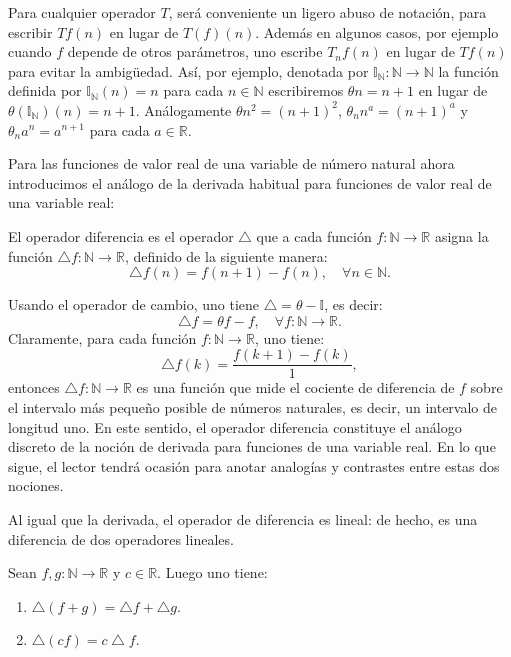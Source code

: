 Para cualquier operador $T$, será conveniente un ligero abuso de notación, para escribir $Tf(n)$ en lugar de $T(f)(n)$. Además en algunos casos, por ejemplo cuando $f$ depende de otros parámetros, uno escribe $T_{n}f(n)$ en lugar de $Tf(n)$ para evitar la ambigüedad. Así, por ejemplo, denotada por $\mathds{I}_{\mathds{N}}\colon\mathds{N}\rightarrow\mathds{N}$ la función definida por $\mathds{I}_{\mathds{N}}(n)=n$ para cada $n\in\mathds{N} $ escribiremos $\theta n=n+1$ en lugar de $\theta(\mathds{I}_{\mathds{N}})(n)=n+1$. Análogamente $\theta n^{2}=(n+1)^{2}$, $\theta_{n}n^{a}=(n+1)^{a}$ y $\theta_{n}a^{n}=a^{n+1}$ para cada $a\in\mathds{R}$.

Para las funciones de valor real de una variable de número natural ahora introducimos el análogo de la derivada habitual para funciones de valor real de una variable real:

\begin{definition}
	El operador diferencia es el operador $\bigtriangleup$ que a cada función $f\colon\mathds{N}\rightarrow\mathds{R}$ asigna la función $\bigtriangleup f\colon\mathds{N}\rightarrow \mathds{R}$, definido de la siguiente manera: \[ \bigtriangleup f(n)=f(n+1)-f(n),\quad\forall n\in\mathds{N}. \]
\end{definition}

\begin{remark}
	Usando el operador de cambio, uno tiene $\bigtriangleup=\theta-\mathds{I}$, es decir: \[ \bigtriangleup f=\theta f-f,\quad\forall f\colon\mathds{N}\rightarrow\mathds{R}. \] Claramente, para cada función $f\colon\mathds{N}\rightarrow\mathds{R}$, uno tiene: \[ \bigtriangleup f(k)=\frac{f(k+1)-f(k)}{1}, \] entonces $\bigtriangleup f\colon\mathds{N}\rightarrow\mathds{R}$ es una función que mide el cociente de diferencia de $f$ sobre el intervalo más pequeño posible de números naturales, es decir, un intervalo de longitud uno. En este sentido, el operador diferencia constituye el análogo discreto de la noción de derivada para funciones de una variable real. En lo que sigue, el lector tendrá ocasión para anotar analogías y contrastes entre estas dos nociones.
\end{remark}

Al igual que la derivada, el operador de diferencia es lineal: de hecho, es una diferencia de dos operadores lineales.

\begin{proposition}
	Sean $ f,g\colon\mathds{N}\rightarrow\mathds{R}$ y $c\in\mathds{R}$. Luego uno tiene:
	\begin{enumerate}
		\item $\bigtriangleup\left(f+g\right)=\bigtriangleup f+\bigtriangleup g$.
		\item $\bigtriangleup(cf)=c\bigtriangleup f$.
	\end{enumerate}
\end{proposition}


